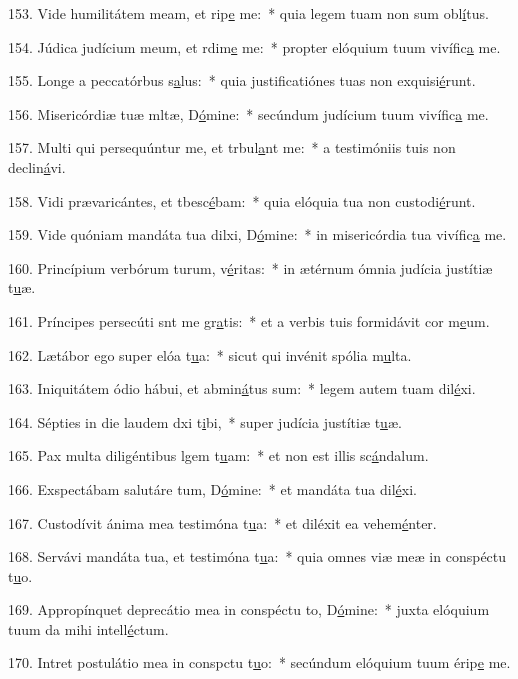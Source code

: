 153. Vide humilitátem meam, et rip\uline{e} me:~* quia legem tuam non sum obl\uline{í}tus.\par 
154. Júdica judícium meum, et rdim\uline{e} me:~* propter elóquium tuum vivífic\uline{a} me.\par 
155. Longe a peccatórbus s\uline{a}lus:~* quia justificatiónes tuas non exquisi\uline{é}runt.\par 
156. Misericórdiæ tuæ mltæ, D\uline{ó}mine:~* secúndum judícium tuum vivífic\uline{a} me.\par 
157. Multi qui persequúntur me, et trbul\uline{a}nt me:~* a testimóniis tuis non declin\uline{á}vi.\par 
158. Vidi prævaricántes, et tbesc\uline{é}bam:~* quia elóquia tua non custodi\uline{é}runt.\par 
159. Vide quóniam mandáta tua dilxi, D\uline{ó}mine:~* in misericórdia tua vivífic\uline{a} me.\par 
160. Princípium verbórum turum, v\uline{é}ritas:~* in ætérnum ómnia judícia justítiæ t\uline{u}æ.\par 
161. Príncipes persecúti snt me gr\uline{a}tis:~* et a verbis tuis formidávit cor m\uline{e}um.\par 
162. Lætábor ego super elóa t\uline{u}a:~* sicut qui invénit spólia m\uline{u}lta.\par 
163. Iniquitátem ódio hábui, et abmin\uline{á}tus sum:~* legem autem tuam dil\uline{é}xi.\par 
164. Sépties in die laudem dxi t\uline{i}bi,~* super judícia justítiæ t\uline{u}æ.\par 
165. Pax multa diligéntibus lgem t\uline{u}am:~* et non est illis sc\uline{á}ndalum.\par 
166. Exspectábam salutáre tum, D\uline{ó}mine:~* et mandáta tua dil\uline{é}xi.\par 
167. Custodívit ánima mea testimóna t\uline{u}a:~* et diléxit ea vehem\uline{é}nter.\par 
168. Servávi mandáta tua, et testimóna t\uline{u}a:~* quia omnes viæ meæ in conspéctu t\uline{u}o.\par 
169. Appropínquet deprecátio mea in conspéctu to, D\uline{ó}mine:~* juxta elóquium tuum da mihi intell\uline{é}ctum.\par 
170. Intret postulátio mea in conspctu t\uline{u}o:~* secúndum elóquium tuum érip\uline{e} me.\par 
